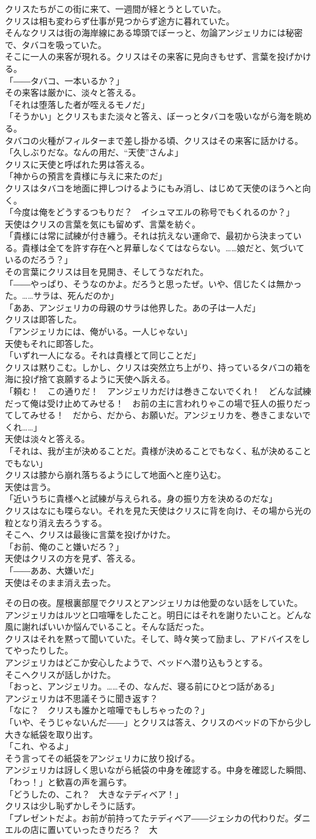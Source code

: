\documentclass[b5j,10pt,openany]{jsbook}
\begin{document}
クリスたちがこの街に来て、一週間が経とうとしていた。\\クリスは相も変わらず仕事が見つからず途方に暮れていた。\\そんなクリスは街の海岸線にある埠頭でぼーっと、勿論アンジェリカには秘密で、タバコを吸っていた。\\そこに一人の来客が現れる。クリスはその来客に見向きもせず、言葉を投げかける。\\「――タバコ、一本いるか？」\\その来客は厳かに、淡々と答える。\\「それは堕落した者が咥えるモノだ」\\「そうかい」とクリスもまた淡々と答え、ぼーっとタバコを吸いながら海を眺める。\\タバコの火種がフィルターまで差し掛かる頃、クリスはその来客に話かける。\\「久しぶりだな。なんの用だ、``天使''さんよ」\\クリスに天使と呼ばれた男は答える。\\「神からの預言を貴様に与えに来たのだ」\\クリスはタバコを地面に押しつけるようにもみ消し、はじめて天使のほうへと向く。\\「今度は俺をどうするつもりだ？　イシュマエルの称号でもくれるのか？」\\天使はクリスの言葉を気にも留めず、言葉を紡ぐ。\\「貴様には常に試練が付き纏う。それは抗えない運命で、最初から決まっている。貴様は全てを許す存在へと昇華しなくてはならない。\ldots{}\ldots{}娘だと、気づいているのだろう？」\\その言葉にクリスは目を見開き、そしてうなだれた。\\「――やっぱり、そうなのかよ。だろうと思ったぜ。いや、信じたくは無かった。\ldots{}\ldots{}サラは、死んだのか」\\「ああ、アンジェリカの母親のサラは他界した。あの子は一人だ」\\クリスは即答した。\\「アンジェリカには、俺がいる。一人じゃない」\\天使もそれに即答した。\\「いずれ一人になる。それは貴様とて同じことだ」\\クリスは黙りこむ。しかし、クリスは突然立ち上がり、持っているタバコの箱を海に投げ捨て哀願するように天使へ訴える。\\「頼む！　この通りだ！　アンジェリカだけは巻きこないでくれ！　どんな試練だって俺は受け止めてみせる！　お前の主に言われりゃこの場で狂人の振りだってしてみせる！　だから、だから、お願いだ。アンジェリカを、巻きこまないでくれ\ldots{}\ldots{}」\\天使は淡々と答える。\\「それは、我が主が決めることだ。貴様が決めることでもなく、私が決めることでもない」\\クリスは膝から崩れ落ちるようにして地面へと座り込む。\\天使は言う。\\「近いうちに貴様へと試練が与えられる。身の振り方を決めるのだな」\\クリスはなにも喋らない。それを見た天使はクリスに背を向け、その場から光の粒となり消え去ろうする。\\そこへ、クリスは最後に言葉を投げかけた。\\「お前、俺のこと嫌いだろ？」\\天使はクリスの方を見ず、答える。\\「――ああ、大嫌いだ」\\天使はそのまま消え去った。

その日の夜。屋根裏部屋でクリスとアンジェリカは他愛のない話をしていた。\\アンジェリカはルツと口喧嘩をしたこと。明日にはそれを謝りたいこと。どんな風に謝ればいいか悩んでいること。そんな話だった。\\クリスはそれを黙って聞いていた。そして、時々笑って励まし、アドバイスをしてやったりした。\\アンジェリカはどこか安心したようで、ベッドへ潜り込もうとする。\\そこへクリスが話しかけた。\\「おっと、アンジェリカ。\ldots{}\ldots{}その、なんだ、寝る前にひとつ話がある」\\アンジェリカは不思議そうに聞き返す？\\「なに？　クリスも誰かと喧嘩でもしちゃったの？」\\「いや、そうじゃないんだ――」とクリスは答え、クリスのベッドの下から少し大きな紙袋を取り出す。\\「これ、やるよ」\\そう言ってその紙袋をアンジェリカに放り投げる。\\アンジェリカは訝しく思いながら紙袋の中身を確認する。中身を確認した瞬間、「わっ！」と歓喜の声を漏らす。\\「どうしたの、これ？　大きなテディベア！」\\クリスは少し恥ずかしそうに話す。\\「プレゼントだよ。お前が前持ってたテディベア――ジェシカの代わりだ。ダニエルの店に置いていったきりだろ？　大
\end{document}
